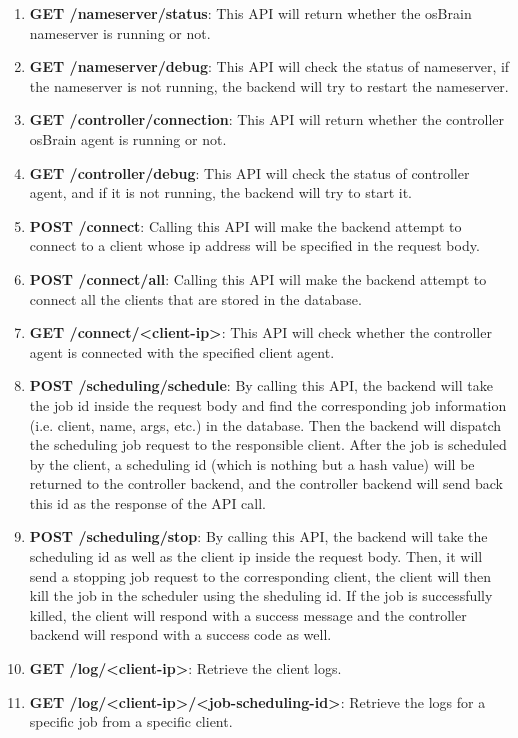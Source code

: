 \documentclass[12pt]{report}
\begin{document}
\begin{enumerate}
\item \textbf{GET /nameserver/status}: This API will return whether the osBrain nameserver is running or not.
\item \textbf{GET /nameserver/debug}: This API will check the status of nameserver, if the nameserver is not running, the backend will try to restart the nameserver.
\item \textbf{GET /controller/connection}: This API will return whether the  controller osBrain agent is running or not.
\item \textbf{GET /controller/debug}: This API will check the status of controller agent, and if it is not running, the backend will try to start it.
\item \textbf{POST /connect}: Calling this API will make the backend attempt to connect to a client whose ip address will be specified in the request body.
\item \textbf{POST /connect/all}: Calling this API will make the backend attempt to connect all the clients that are stored in the database.
\item \textbf{GET /connect/\textless client-ip\textgreater}: This API will check whether the controller agent is connected with the specified client agent.
\item \textbf{POST /scheduling/schedule}: By calling this API, the backend will take the job id inside the request body and find the corresponding job information (i.e. client, name, args, etc.) in the database. Then the backend will dispatch the scheduling job request to the responsible client. After the job is scheduled by the client, a scheduling id (which is nothing but a hash value) will be returned to the controller backend, and the controller backend will send back this id as the response of the API call.
\item \textbf{POST /scheduling/stop}: By calling this API, the backend will take the scheduling id as well as the client ip inside the request body. Then, it will send a stopping job request to the corresponding client, the client will then kill the job in the scheduler using the sheduling id. If the job is successfully killed, the client will respond with a success message and the controller backend will respond with a success code as well.
\item \textbf{GET /log/\textless client-ip\textgreater}: Retrieve the client logs.
\item \textbf{GET /log/\textless client-ip\textgreater /\textless job-scheduling-id\textgreater}: Retrieve the logs for a specific job from a specific client.
\end{enumerate}
\end{document}
